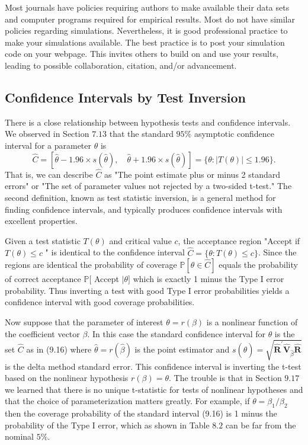 \documentclass[10pt]{article}
\begin{document}
Most journals have policies requiring authors to make available their data sets and computer programs required for empirical results. Most do not have similar policies regarding simulations. Nevertheless, it is good professional practice to make your simulations available. The best practice is to post your simulation code on your webpage. This invites others to build on and use your results, leading to possible collaboration, citation, and/or advancement.

\subsection{Confidence Intervals by Test Inversion}
There is a close relationship between hypothesis tests and confidence intervals. We observed in Section $7.13$ that the standard $95 \%$ asymptotic confidence interval for a parameter $\theta$ is
$$
\widehat{C}=[\widehat{\theta}-1.96 \times s(\widehat{\theta}), \quad \widehat{\theta}+1.96 \times s(\widehat{\theta})]=\{\theta:|T(\theta)| \leq 1.96\} .
$$
That is, we can describe $\widehat{C}$ as "The point estimate plus or minus 2 standard errors" or "The set of parameter values not rejected by a two-sided t-test." The second definition, known as test statistic inversion, is a general method for finding confidence intervals, and typically produces confidence intervals with excellent properties.

Given a test statistic $T(\theta)$ and critical value $c$, the acceptance region "Accept if $T(\theta) \leq c$ " is identical to the confidence interval $\widehat{C}=\{\theta: T(\theta) \leq c\}$. Since the regions are identical the probability of coverage $\mathbb{P}[\theta \in \widehat{C}]$ equals the probability of correct acceptance $\mathbb{P}[$ Accept $\mid \theta]$ which is exactly 1 minus the Type I error probability. Thus inverting a test with good Type I error probabilities yields a confidence interval with good coverage probabilities.

Now suppose that the parameter of interest $\theta=r(\beta)$ is a nonlinear function of the coefficient vector $\beta$. In this case the standard confidence interval for $\theta$ is the set $\widehat{C}$ as in (9.16) where $\widehat{\theta}=r(\widehat{\beta})$ is the point estimator and $s(\widehat{\theta})=\sqrt{\widehat{\boldsymbol{R}}^{\prime} \widehat{\boldsymbol{V}}_{\widehat{\beta}} \widehat{\boldsymbol{R}}}$ is the delta method standard error. This confidence interval is inverting the t-test based on the nonlinear hypothesis $r(\beta)=\theta$. The trouble is that in Section $9.17$ we learned that there is no unique t-statistic for tests of nonlinear hypotheses and that the choice of parameterization matters greatly. For example, if $\theta=\beta_{1} / \beta_{2}$ then the coverage probability of the standard interval (9.16) is 1 minus the probability of the Type I error, which as shown in Table $8.2$ can be far from the nominal $5 \%$.
\end{document}
